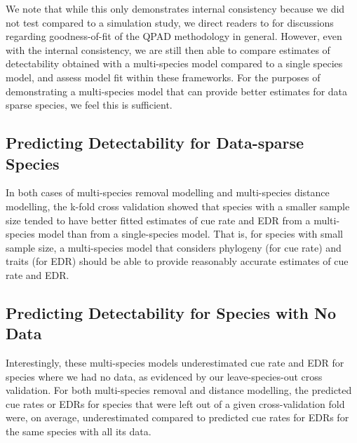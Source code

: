 \documentclass[12pt]{article}
\begin{document}
\par We note that while this only demonstrates internal consistency because we did not test compared to a simulation study, we direct readers to \citet{solymos_calibrating_2013, solymos_evaluating_2018, solymos_lessons_2020} for discussions regarding goodness-of-fit of the QPAD methodology in general.
However, even with the internal consistency, we are still then able to compare estimates of detectability obtained with a multi-species model compared to a single species model, and assess model fit within these frameworks.
For the purposes of demonstrating a multi-species model that can provide better estimates for data sparse species, we feel this is sufficient. 

\subsection{Predicting Detectability for Data-sparse Species}

\par In both cases of multi-species removal modelling and multi-species distance modelling, the k-fold cross validation showed that species with a smaller sample size tended to have better fitted estimates of cue rate and EDR from a multi-species model than from a single-species model.
That is, for species with small sample size, a multi-species model that considers phylogeny (for cue rate) and traits (for EDR) should be able to provide reasonably accurate estimates of cue rate and EDR.

\subsection{Predicting Detectability for Species with No Data}\label{discussion-nodata}

\par Interestingly, these multi-species models underestimated cue rate and EDR for species where we had no data, as evidenced by our leave-species-out cross validation.
For both multi-species removal and distance modelling, the predicted cue rates or EDRs for species that were left out of a given cross-validation fold were, on average, underestimated compared to predicted cue rates for EDRs for the same species with all its data.
\end{document}
